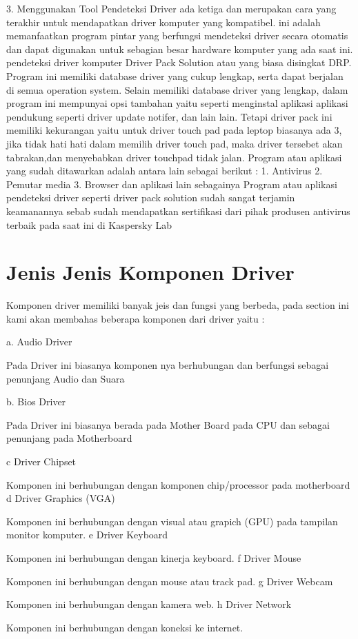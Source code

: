 3. Menggunakan Tool Pendeteksi Driver
ada ketiga dan merupakan cara yang terakhir untuk mendapatkan driver komputer yang kompatibel.
ini adalah memanfaatkan program pintar yang berfungsi mendeteksi driver secara otomatis dan dapat digunakan untuk sebagian besar hardware komputer yang ada saat ini.
pendeteksi driver komputer  Driver Pack Solution atau yang biasa disingkat DRP.
Program ini memiliki database driver yang cukup lengkap, serta dapat berjalan di semua operation system.
Selain memiliki database driver yang lengkap, dalam program ini mempunyai opsi tambahan yaitu seperti menginstal aplikasi aplikasi pendukung seperti driver update notifer, dan lain lain.
Tetapi driver pack ini memiliki kekurangan yaitu untuk driver touch pad pada leptop biasanya ada 3, jika tidak hati hati dalam memilih driver touch pad, maka driver tersebet akan tabrakan,dan menyebabkan driver touchpad tidak jalan.
Program atau aplikasi  yang sudah ditawarkan adalah antara lain sebagai berikut :
1.	Antivirus 
2.	Pemutar media
3.	Browser dan aplikasi lain sebagainya 
Program atau aplikasi pendeteksi driver seperti driver pack solution sudah sangat terjamin keamanannya sebab sudah mendapatkan sertifikasi dari pihak produsen antivirus terbaik pada saat ini di Kaspersky Lab 


\section {Jenis Jenis Komponen Driver}

Komponen driver memiliki banyak jeis dan fungsi yang berbeda, pada section ini kami akan membahas beberapa komponen dari driver yaitu : 

a. Audio Driver

Pada Driver ini biasanya komponen nya berhubungan dan berfungsi sebagai penunjang Audio dan Suara

b. Bios Driver

Pada Driver ini biasanya berada pada Mother Board pada CPU dan sebagai penunjang pada Motherboard

c	Driver Chipset 

 Komponen ini berhubungan dengan komponen chip/processor pada motherboard
d	Driver Graphics (VGA) 

 Komponen ini berhubungan dengan visual atau grapich (GPU) pada tampilan monitor komputer.
e	Driver Keyboard 

 Komponen ini berhubungan dengan kinerja keyboard.
f	Driver Mouse

 Komponen ini berhubungan dengan mouse atau track pad.
g	Driver Webcam 

 Komponen ini berhubungan dengan kamera web.
h	Driver Network 

 Komponen ini berhubungan dengan koneksi ke internet.

